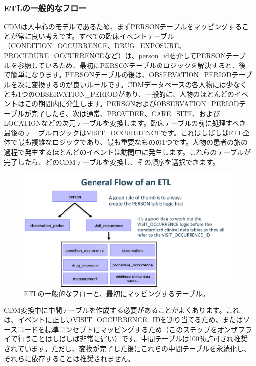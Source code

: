 \documentclass[
  11pt]{book}
\theoremstyle{definition}
\theoremstyle{definition}
\theoremstyle{definition}
\theoremstyle{definition}
\theoremstyle{remark}
\begin{document}
\subsubsection*{ETLの一般的なフロー}\label{etlux306eux4e00ux822cux7684ux306aux30d5ux30edux30fc}

CDMは人中心のモデルであるため、まずPERSONテーブルをマッピングすることが常に良い考えです。すべての臨床イベントテーブル（CONDITION\_OCCURRENCE、DRUG\_EXPOSURE、PROCEDURE\_OCCURRENCEなど）は、person\_idを介してPERSONテーブルを参照しているため、最初にPERSONテーブルのロジックを解決すると、後で簡単になります。PERSONテーブルの後は、OBSERVATION\_PERIODテーブルを次に変換するのが良いルールです。CDMデータベースの各人物には少なくとも1つのOBSERVATION\_PERIODがあり、一般的に、人物のほとんどのイベントはこの期間内に発生します。PERSONおよびOBSERVATION\_PERIODテーブルが完了したら、次は通常、PROVIDER、CARE\_SITE、およびLOCATIONなどの次元テーブルを変換します。臨床テーブルの前に処理すべき最後のテーブルロジックはVISIT\_OCCURRENCEです。これはしばしばETL全体で最も複雑なロジックであり、最も重要なものの1つです。人物の患者の旅の過程で発生するほとんどのイベントは訪問中に発生します。これらのテーブルが完了したら、どのCDMテーブルを変換し、その順序を選択できます。

\begin{figure}

{\centering \includegraphics[width=1\linewidth]{images/ExtractTransformLoad/flowOfEtl} 

}

\caption{ETLの一般的なフローと、最初にマッピングするテーブル。}\label{fig:etlFlow}
\end{figure}

CDM変換中に中間テーブルを作成する必要があることがよくあります。これは、イベントに正しいVISIT\_OCCURRENCE\_IDを割り当てるため、またはソースコードを標準コンセプトにマッピングするため（このステップをオンザフライで行うことはしばしば非常に遅い）です。中間テーブルは100％許可され推奨されています。ただし、変換が完了した後にこれらの中間テーブルを永続化し、それらに依存することは推奨されません。
\end{document}
